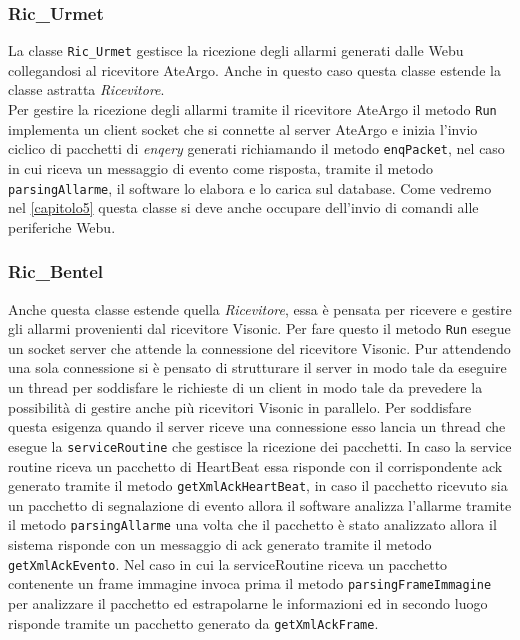 \subsubsection{Ric\_Urmet}
La classe \texttt{Ric\_Urmet} gestisce la ricezione degli allarmi generati dalle Webu collegandosi al ricevitore AteArgo.
Anche in questo caso questa classe estende la classe astratta \emph{Ricevitore}.\\
Per gestire la ricezione degli allarmi tramite il ricevitore AteArgo il metodo \texttt{Run} implementa un client socket che si connette al server AteArgo e inizia l'invio ciclico di pacchetti di \emph{enqery} generati richiamando il metodo \texttt{enqPacket}, nel caso in cui riceva un messaggio di evento come risposta, tramite il metodo \texttt{parsingAllarme}, il software lo elabora e lo carica sul database. Come vedremo nel \chaptername \ref{capitolo5} questa classe si deve anche occupare dell'invio di comandi alle periferiche Webu.\\
\subsubsection{Ric\_Bentel}
Anche questa classe estende quella \emph{Ricevitore}, essa è pensata per ricevere e gestire gli allarmi provenienti dal ricevitore Visonic. Per fare questo il metodo \texttt{Run} esegue un socket server che attende la connessione del ricevitore Visonic. Pur attendendo una sola connessione si è pensato di strutturare il server in modo tale da eseguire un thread per soddisfare le richieste di un client in modo tale da prevedere la possibilità di gestire anche più ricevitori Visonic in parallelo. Per soddisfare questa esigenza quando il server riceve una connessione esso lancia un thread che esegue la \texttt{serviceRoutine} che gestisce la ricezione dei pacchetti. In caso la service routine riceva un pacchetto di HeartBeat essa risponde con il corrispondente ack generato tramite il metodo \texttt{getXmlAckHeartBeat}, in caso il pacchetto ricevuto sia un pacchetto di segnalazione di evento allora il software analizza l'allarme tramite il metodo \texttt{parsingAllarme} una volta che il pacchetto è stato analizzato allora il sistema risponde con un messaggio di ack generato tramite il metodo \texttt{getXmlAckEvento}. Nel caso in cui la serviceRoutine riceva un pacchetto contenente un frame immagine invoca prima il metodo \texttt{parsingFrameImmagine} per analizzare il pacchetto ed estrapolarne le informazioni ed in secondo luogo risponde tramite un pacchetto generato da \texttt{getXmlAckFrame}.
